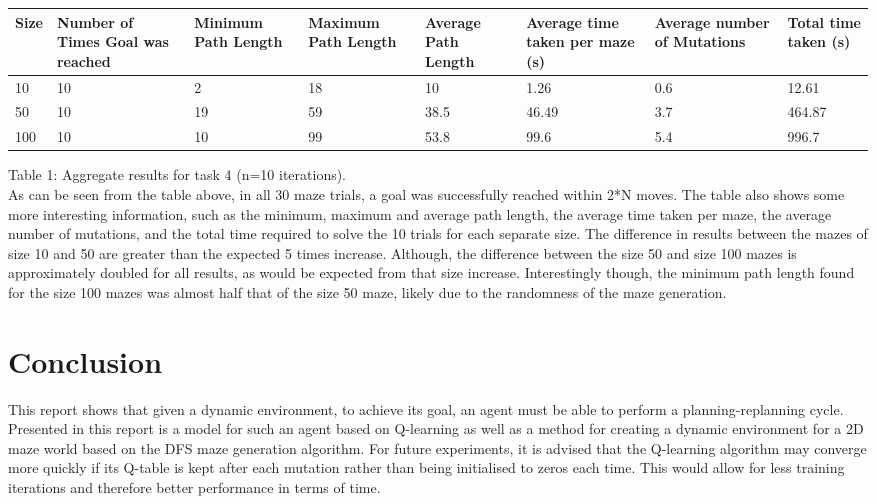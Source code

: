 \documentclass{article}
\begin{document}
        \begin{tabular}{ | m{1cm} | m{5em}| m{2cm} | m{2cm} | m{2cm} | m{2cm} | m{2cm} | m{2cm} | } 
	\hline
	Size & Number of Times Goal was reached & Minimum Path Length & Maximum Path Length & Average Path Length & Average time taken
	per maze (s) & Average number of Mutations & Total time taken (s)\\
	  \hline
	  10 & 10 & 2 & 18 & 10 & 1.26 & 0.6 & 12.61 \\ 
	  \hline
	  50 & 10 & 19 & 59 & 38.5 & 46.49 & 3.7 & 464.87 \\ 
	  \hline
	  100 & 10 & 10 & 99 & 53.8 & 99.6 & 5.4 & 996.7 \\ 
	  \hline
	\end{tabular}
	Table 1: Aggregate results for task 4 (n=10 iterations).
	\vspace*{1cm} \\
	As can be seen from the table above, in all 30 maze trials, a goal was successfully reached within 2*N moves. The table also shows some more interesting information, such as the minimum, maximum and average path length, the average time taken per maze, the average number of mutations, and the total time required to solve the 10 trials for each separate size. The difference in results between the mazes of size 10 and 50 are greater than the expected 5 times increase. Although, the difference between the size 50 and size 100 mazes is approximately doubled for all results, as would be expected from that size increase. Interestingly though, the minimum path length found for the size 100 mazes was almost half that of the size 50 maze, likely due to the randomness of the maze generation.

    
	\section{Conclusion}\label{sec:conclusion}
	This report shows that given a dynamic environment, to achieve its goal, an agent must be able to perform a planning-replanning cycle. Presented in this report is a model for such an agent based on Q-learning as well as a method for creating a dynamic environment for a 2D maze world based on the DFS maze generation algorithm. For future experiments, it is advised that the Q-learning algorithm may converge more quickly if its Q-table is kept after each mutation rather than being initialised to zeros each time. This would allow for less training iterations and therefore better performance in terms of time. 


    
    
\end{document}

